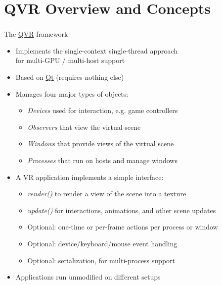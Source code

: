 \documentclass[utf8,stillsansserifmath,fleqn,t]{beamer}
\begin{document}
\section{QVR Overview and Concepts}

\begin{frame}
\frametitle{\insertsection}
The \href{https://marlam.de/qvr}{QVR} framework
\begin{itemize}
\item Implements the single-context single-thread approach\\ for multi-GPU / multi-host support
\item Based on \href{http://www.qt.io/}{Qt} (requires nothing else)
\item Manages four major types of objects:
    \begin{itemize}
    \item \emph{Devices} used for interaction, e.g. game controllers
    \item \emph{Observers} that view the virtual scene
    \item \emph{Windows} that provide views of the virtual scene
    \item \emph{Processes} that run on hosts and manage windows 
    \end{itemize}
\item A VR application implements a simple interface:
    \begin{itemize}
    \item \emph{render()} to render a view of the scene into a texture
    \item \emph{update()} for interactions, animations, and other scene updates
    \item Optional: one-time or per-frame actions per process or window
    \item Optional: device/keyboard/mouse event handling
    \item Optional: serialization, for multi-process support
    \end{itemize}
\item Applications run unmodified on different setups
\end{itemize}
\end{frame}
\end{document}
